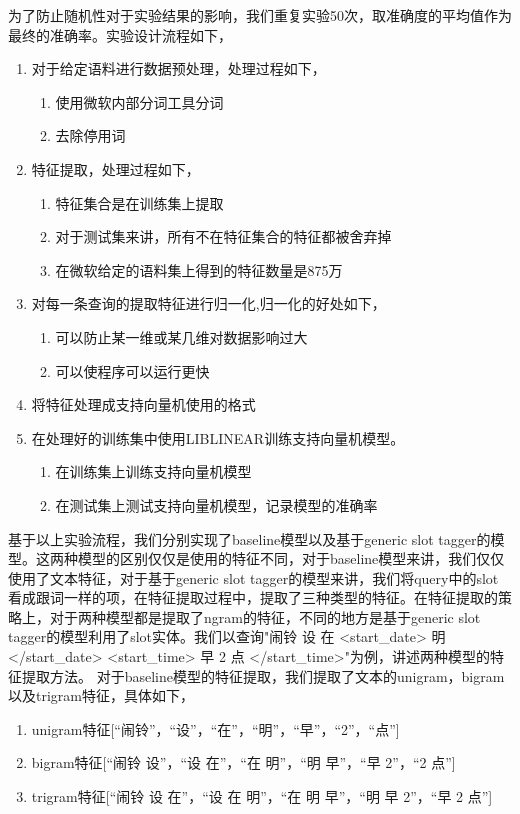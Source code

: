 \documentclass[master]{njuthesis}
\begin{document}
     为了防止随机性对于实验结果的影响，我们重复实验50次，取准确度的平均值作为最终的准确率。实验设计流程如下，
\begin{enumerate}
  \item 对于给定语料进行数据预处理，处理过程如下，
    \begin{enumerate}
      \item 使用微软内部分词工具分词
      \item 去除停用词
    \end{enumerate}
  \item 特征提取，处理过程如下，
    \begin{enumerate}
      \item 特征集合是在训练集上提取
      \item 对于测试集来讲，所有不在特征集合的特征都被舍弃掉
      \item 在微软给定的语料集上得到的特征数量是875万
    \end{enumerate}
  \item 对每一条查询的提取特征进行归一化,归一化的好处如下，
    \begin{enumerate}
      \item 可以防止某一维或某几维对数据影响过大
      \item 可以使程序可以运行更快
    \end{enumerate}
  \item 将特征处理成支持向量机使用的格式
  \item 在处理好的训练集中使用LIBLINEAR训练支持向量机模型。
    \begin{enumerate}
      \item 在训练集上训练支持向量机模型
      \item 在测试集上测试支持向量机模型，记录模型的准确率
    \end{enumerate}
\end{enumerate}
    
    基于以上实验流程，我们分别实现了baseline模型以及基于generic slot tagger的模型。这两种模型的区别仅仅是使用的特征不同，对于baseline模型来讲，我们仅仅使用了文本特征，对于基于generic slot tagger的模型来讲，我们将query中的slot看成跟词一样的项，在特征提取过程中，提取了三种类型的特征。在特征提取的策略上，对于两种模型都是提取了ngram的特征，不同的地方是基于generic slot tagger的模型利用了slot实体。我们以查询"闹铃 设 在 <start\_date> 明 </start\_date> <start\_time> 早 2 点 </start\_time>"为例，讲述两种模型的特征提取方法。
    对于baseline模型的特征提取，我们提取了文本的unigram，bigram以及trigram特征，具体如下，
    \begin{enumerate}
      \item unigram特征[“闹铃”，“设”，“在”，“明”，“早”，“2”，“点”]
      \item bigram特征[“闹铃 设”，“设 在”，“在 明”，“明 早”，“早 2”，“2 点”]
      \item trigram特征[“闹铃 设 在”，“设 在 明”，“在 明 早”，“明 早 2”，“早 2 点”]
    \end{enumerate}
\end{document}
